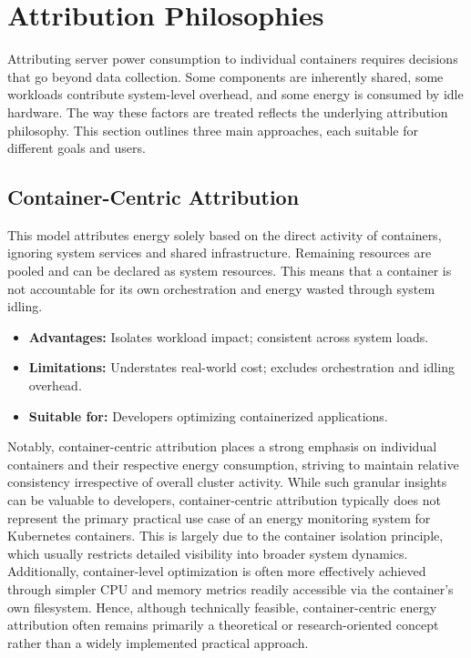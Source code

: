 \section{Attribution Philosophies}
\label{sec:attribution-philosophies}

Attributing server power consumption to individual containers requires decisions that go beyond data collection. Some components are inherently shared, some workloads contribute system-level overhead, and some energy is consumed by idle hardware. The way these factors are treated reflects the underlying attribution philosophy. This section outlines three main approaches, each suitable for different goals and users.

\subsection{Container-Centric Attribution}
\label{sec:container-centric}

This model attributes energy solely based on the direct activity of containers, ignoring system services and shared infrastructure. Remaining resources are pooled and can be declared as system resources. This means that a container is not accountable for its own orchestration and energy wasted through system idling.

\begin{itemize}
    \item \textbf{Advantages:} Isolates workload impact; consistent across system loads.
    \item \textbf{Limitations:} Understates real-world cost; excludes orchestration and idling overhead.
    \item \textbf{Suitable for:} Developers optimizing containerized applications.
\end{itemize}

Notably, container-centric attribution places a strong emphasis on individual containers and their respective energy consumption, striving to maintain relative consistency irrespective of overall cluster activity. While such granular insights can be valuable to developers, container-centric attribution typically does not represent the primary practical use case of an energy monitoring system for Kubernetes containers. This is largely due to the container isolation principle, which usually restricts detailed visibility into broader system dynamics. Additionally, container-level optimization is often more effectively achieved through simpler CPU and memory metrics readily accessible via the container’s own  filesystem. Hence, although technically feasible, container-centric energy attribution often remains primarily a theoretical or research-oriented concept rather than a widely implemented practical approach.

